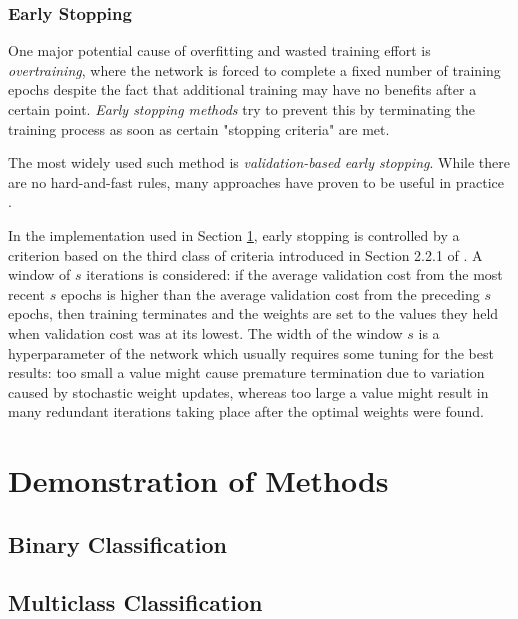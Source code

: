 \documentclass{article}[11pt]
\begin{document}
        \subsubsection{Early Stopping}
            
            One major potential cause of overfitting and wasted training effort is \textit{overtraining}, where the network is forced to complete a fixed number of training epochs despite the fact that additional training may have no benefits after a certain point. \textit{Early stopping methods} try to prevent this by terminating the training process as soon as certain "stopping criteria" are met.
            
            The most widely used such method is \textit{validation-based early stopping}. While there are no hard-and-fast rules, many approaches have proven to be useful in practice \cite{early_stopping}.
            
            In the implementation used in Section \ref{sec:demos}, early stopping is controlled by a criterion based on the third class of criteria introduced in Section 2.2.1 of \cite{early_stopping}. A window of $s$ iterations is considered: if the average validation cost from the most recent $s$ epochs is higher than the average validation cost from the preceding $s$ epochs, then training terminates and the weights are set to the values they held when validation cost was at its lowest. The width of the window $s$ is a hyperparameter of the network which usually requires some tuning for the best results: too small a value might cause premature termination due to variation caused by stochastic weight updates, whereas too large a value might result in many redundant iterations taking place after the optimal weights were found.
            
            
            
            



\section{Demonstration of Methods} \label{sec:demos}

    \subsection{Binary Classification}
    
    \subsection{Multiclass Classification}
        
\end{document}
